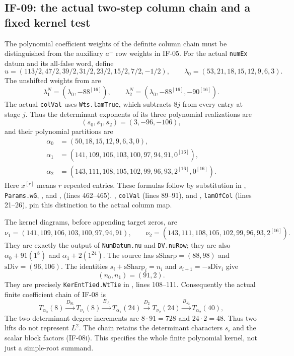 \documentclass[11pt,a4paper]{article}
\theoremstyle{definition}
\theoremstyle{remark}
\begin{document}
\subsection{IF-09: the actual two-step column chain and a fixed kernel test}
The polynomial coefficient weights of the definite column chain must
be distinguished from the auxiliary $a^+$ row weights in IF-05.
For the actual \texttt{numEx} datum and its all-false word, define
\[
 u=(113/2,47/2,39/2,31/2,23/2,15/2,7/2,-1/2),\qquad
 \lambda_0=(53,21,18,15,12,9,6,3).
\]
The unshifted weights from  are
\[
 \lambda_1^N=(\lambda_0,-88^{[16]}),\qquad
 \lambda_2^N=(\lambda_0,-88^{[16]},-90^{[16]}).
\]
The actual \texttt{colVal} uses \texttt{Wts.lamTrue}, which subtracts
$8j$ from every entry at stage $j$. Thus the determinant exponents of
its three polynomial realizations are
\[
 (s_0,s_1,s_2)=(3,-96,-106),
\]
and their polynomial partitions are
\[
\begin{split}
 \alpha_0&=(50,18,15,12,9,6,3,0),\\
 \alpha_1&=(141,109,106,103,100,97,94,91,0^{[16]}),\\
 \alpha_2&=(143,111,108,105,102,99,96,93,2^{[16]},0^{[16]}).
\end{split}                                                     \tag{IF-09a}
\]
Here $x^{[r]}$ means $r$ repeated entries. These formulas follow by
substitution in ,
\texttt{Params.wG}, , and
,
 (lines 462--465).
, \texttt{colVal} (lines 89--91), and
, \texttt{lamOfCol} (lines 21--26),
pin this distinction to the actual column map.

The kernel diagrams, before appending target zeros, are
\[
 \nu_1=(141,109,106,103,100,97,94,91),\qquad
 \nu_2=(143,111,108,105,102,99,96,93,2^{[16]}).       \tag{IF-09b}
\]
They are exactly the output of \texttt{NumDatum.nu} and
\texttt{DV.nuRow}; they are also
$\alpha_0+91(1^8)$ and $\alpha_1+2(1^{24})$.
The source has
$\mathrm{sSharp}=(88,98)$ and $\mathrm{sDiv}=(96,106)$.
The identities
$s_i+\mathrm{sSharp}_i=n_i$ and
$s_{i+1}=-\mathrm{sDiv}_i$ give
\[
 (n_0,n_1)=(91,2).                                  \tag{IF-09c}
\]
They are precisely \texttt{KerEntTied.WtTie} in
, lines 108--111.
Consequently the actual finite coefficient chain of IF-08 is
\[
 T_{\alpha_0}(8)\xrightarrow{D_{91}}
 T_{\nu_1}(8)\xrightarrow{B_{J_1}}
 T_{\alpha_1}(24)\xrightarrow{D_2}
 T_{\nu_2}(24)\xrightarrow{B_{J_2}}
 T_{\alpha_2}(40),                                  \tag{IF-09d}
\]
The two determinant degree increments are $8\cdot91=728$ and
$24\cdot2=48$. Thus two lifts do not represent $L^2$.
The chain retains the determinant characters $s_i$ and the scalar block
factors (IF-08i). This specifies the whole finite polynomial kernel,
not just a simple-root summand.
\end{document}
